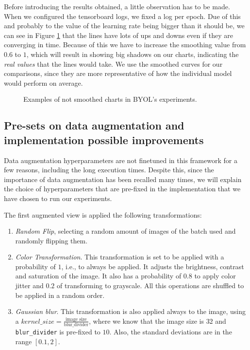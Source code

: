 Before introducing the results obtained, a little observation has to be made. When we configured the tensorboard logs, we fixed a log per epoch. Due of this and probably to the value of the learning rate being bigger than it should be, we can see in Figure \ref{fig:byol:not:smoothed} that the lines have lots of ups and downs even if they are converging in time. Because of this we have to increase the smoothing value from $0.6$ to $1$, which will result in showing big shadows on our charts, indicating the \emph{real values} that the lines would take. We use the smoothed curves for our comparisons, since they are more representative of how the individual model would perform on average.


\begin{figure}[htp] 
    \centering
    \hfill%
        \caption{Examples of not smoothed charts in BYOL's experiments. }
        \label{fig:byol:not:smoothed}
\end{figure}

\subsection{Pre-sets on data augmentation and implementation possible improvements}
\label{byol:preset}

Data augmentation hyperparameters are not finetuned in this framework for a few reasons, including the long execution times. Despite this, since the importance of data augmentation has been recalled many times, we will explain the choice of hyperparameters that are pre-fixed in the implementation that we have chosen to run our experiments.

The first augmented view is applied the following transformations:
\begin{enumerate}
\item \emph{Random Flip}, selecting a random amount of images of the batch used and randomly flipping them.
\item \emph{Color Transformation}. This transformation is set to be applied with a probability of $1$, i.e., to always be applied. It adjusts the brightness, contrast and saturation of the image. It also has a probability of $0.8$ to apply color jitter and $0.2$ of transforming to grayscale. All this operations are shuffled to be applied in a random order.

\item \emph{Gaussian blur}. This transformation is also applied always to the image, using a $kernel\_size = \frac{\text{image size}}{\text{blur\_divider}}$, where we know that the image size is $32$ and \lstinline{blur_divider} is pre-fixed to $10$. Also, the standard deviations are in the range $[0.1,2]$.
\end{enumerate}

